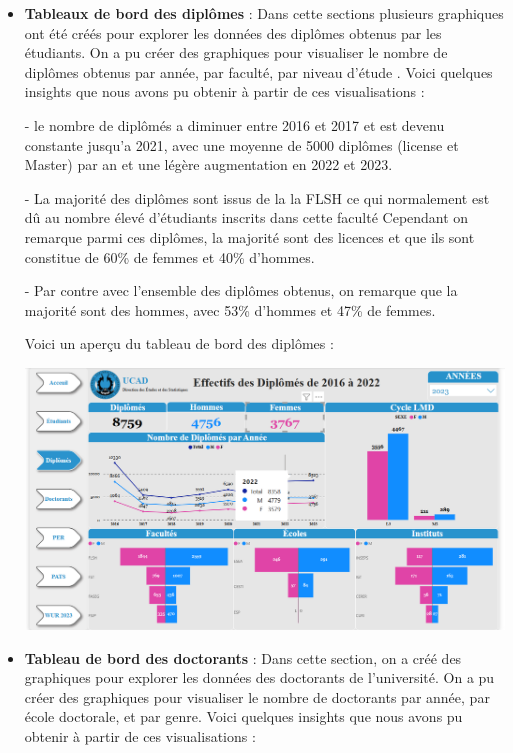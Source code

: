 \begin{itemize}
    \item \textbf{Tableaux de bord des diplômes} : Dans cette sections plusieurs graphiques ont été créés pour explorer les données des diplômes obtenus par les étudiants. On a pu créer des graphiques pour visualiser le nombre de diplômes obtenus par année, par faculté, par niveau d'étude . Voici quelques insights que nous avons pu obtenir à partir de ces visualisations :
    
    - le nombre de diplômés a diminuer entre  2016 et 2017 et est devenu constante  jusqu'a 2021, avec une moyenne de 5000 diplômes (license et Master) par an et une légère augmentation en 2022 et 2023.

    - La majorité des diplômes sont issus de la la FLSH ce qui normalement est dû au nombre élevé d'étudiants inscrits dans cette faculté Cependant on remarque parmi ces diplômes, la majorité sont des licences et que ils sont constitue de 60\% de femmes et 40\% d'hommes.

    - Par contre avec l'ensemble des diplômes obtenus, on remarque que la majorité sont des hommes, avec 53\% d'hommes et 47\% de femmes. 

    Voici un aperçu du tableau de bord des diplômes :

    \begin{center}
    \includegraphics[width=1\textwidth]{image/diplomes.png} 
    \end{center}

    
    \item \textbf{Tableau de bord des doctorants} : Dans cette section, on a créé des graphiques pour explorer les données des doctorants de l'université. On a pu créer des graphiques pour visualiser le nombre de doctorants par année, par école doctorale,  et par genre. Voici quelques insights que nous avons pu obtenir à partir de ces visualisations : 
    

\end{itemize}
